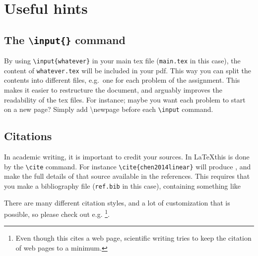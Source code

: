 \section{Useful hints}
\subsection{The \texttt{\textbackslash input\{\}} command}
By using \texttt{\textbackslash input\{whatever\}} in your main tex file (\texttt{main.tex} in this case), the content of \texttt{whatever.tex} will be included in your pdf. This way you can split the contents into different files, e.g.~one for each problem of the assignment. This makes it easier to restructure the document, and arguably improves the readability of the tex files. For instance; maybe you want each problem to start on a new page? Simply add \textbackslash newpage before each \texttt{\textbackslash input} command.

\subsection{Citations}
In academic writing, it is important to credit your sources. In \LaTeX this is done by the \texttt{\textbackslash cite} command. For instance \texttt{\textbackslash cite\{chen2014linear\}} will produce \cite{chen2014linear}, and make the full details of that source available in the references. This requires that you make a bibliography file (\texttt{ref.bib} in this case), containing something like


There are many different citation styles, and a lot of customization that is possible, so please check out e.g. \cite{wikibookLatex}\footnote{Even though this cites a web page, scientific writing tries to keep the citation of web pages to a minimum.}.
